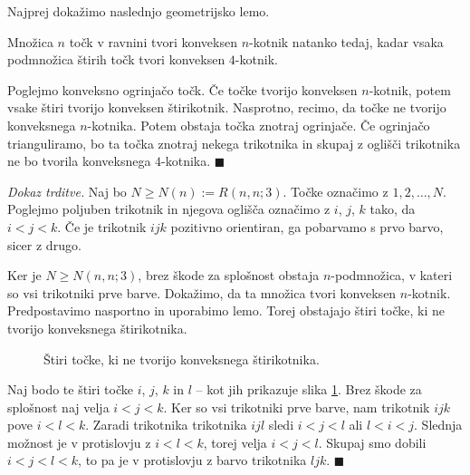 \documentclass[twoside,11pt]{article}
\begin{document}
Najprej dokažimo naslednjo geometrijsko lemo.
\begin{lema}
    Množica $n$ točk v ravnini tvori konveksen $n$-kotnik natanko tedaj, kadar
    vsaka podmnožica štirih točk tvori konveksen $4$-kotnik.
\end{lema}
\begin{dokaz}
    Poglejmo konveksno ogrinjačo točk. Če točke tvorijo konveksen $n$-kotnik, potem vsake 
    štiri tvorijo konveksen štirikotnik. Nasprotno, recimo, da točke ne tvorijo konveksnega 
    $n$-kotnika. Potem obstaja točka znotraj ogrinjače. Če ogrinjačo trianguliramo, bo ta 
    točka znotraj nekega trikotnika in skupaj z oglišči trikotnika ne bo tvorila 
    konveksnega $4$-kotnika. \hfill $\blacksquare$
\end{dokaz}

\noindent\textit{Dokaz trditve.}
    Naj bo $N \ge N(n) := R(n,n;3)$. Točke označimo z $1, 2, \dots, N$. 
    Poglejmo poljuben trikotnik in njegova oglišča označimo z $i$, $j$, $k$ tako, da $i < j < k$. Če je 
    trikotnik $ijk$ pozitivno orientiran, ga pobarvamo s prvo barvo, sicer z drugo.

    Ker je $N \ge N(n,n;3)$, brez škode za splošnost obstaja $n$-podmnožica, v kateri so 
    vsi trikotniki prve barve. Dokažimo, da ta množica tvori konveksen $n$-kotnik. Predpostavimo 
    nasportno in uporabimo lemo. Torej obstajajo štiri točke, ki ne tvorijo konveksnega 
    štirikotnika. %
\begin{figure}[h!]
    \centering
    \caption{Štiri točke, ki ne tvorijo konveksnega štirikotnika.}
    \label{fig:happy}
\end{figure}
    Naj bodo te štiri točke $i$, $j$, $k$ in $l$ -- kot jih prikazuje slika \ref{fig:happy}. 
    Brez škode za splošnost naj velja $i < j < k$. Ker so vsi trikotniki prve barve, nam 
    trikotnik $ijk$ pove $i < l < k$. Zaradi trikotnika 
    trikotnika $ijl$ sledi $i < j < l$ ali $l < i < j$. Slednja možnost je v 
    protislovju z $i < l < k$, torej velja $i < j < l$. Skupaj 
    smo dobili $i < j < l < k$, to pa je v protislovju z barvo trikotnika 
    $ljk$. \hfill $\blacksquare$
\end{document}
